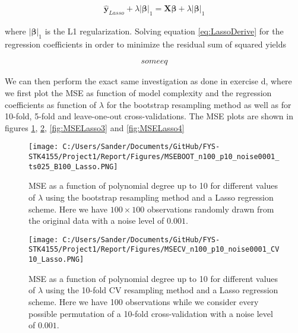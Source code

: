 \documentclass[12pt,a4paper]{article}
\begin{document}
\begin{equation}\label{eq:LassoDerive}
\begin{aligned}
\boldsymbol{\hat{y}}_{Lasso} + \lambda |\boldsymbol{\beta}|_1 = \textbf{X}\boldsymbol{\beta} + \lambda  |\boldsymbol{\beta}|_1
\end{aligned}
\end{equation}

\noindent where $|\boldsymbol{\beta}|_1$ is the L1 regularization. Solving equation \ref{eq:LassoDerive} for the regression coefficients in order to minimize the residual sum of squared yields

\begin{equation}\label{eq:LassoDerive2}
\begin{aligned}
some eq
\end{aligned}
\end{equation}

\noindent We can then perform the exact same investigation as done in exercise d, where we first plot the MSE as function of model complexity and the regression coefficients as function of $\lambda$ for the bootstrap resampling method as well as for 10-fold, 5-fold and leave-one-out cross-validations. The MSE plots are shown in figures \ref{fig:MSELasso1}, \ref{fig:MSELasso2}, \ref{fig:MSELasso3} and \ref{fig:MSELasso4}

\begin{figure}[H]
\centering
\texttt{[image: C:/Users/Sander/Documents/GitHub/FYS-STK4155/Project1/Report/Figures/MSEBOOT\_n100\_p10\_noise0001\_ts025\_B100\_Lasso.PNG]}
\caption{\label{fig:MSELasso1} MSE as a function of polynomial degree up to 10 for different values of $\lambda$ using the bootstrap resampling method and a Lasso regression scheme. Here we have $100 \times 100$ observations randomly drawn from the original data with a noise level of $0.001$.}
\end{figure}

\begin{figure}[H]
\centering
\texttt{[image: C:/Users/Sander/Documents/GitHub/FYS-STK4155/Project1/Report/Figures/MSECV\_n100\_p10\_noise0001\_CV10\_Lasso.PNG]}
\caption{\label{fig:MSELasso2} MSE as a function of polynomial degree up to 10 for different values of $\lambda$ using the 10-fold CV resampling method and a Lasso regression scheme. Here we have 100 observations while we consider every possible permutation of a 10-fold cross-validation with a noise level of $0.001$.}
\end{figure}
\end{document}
